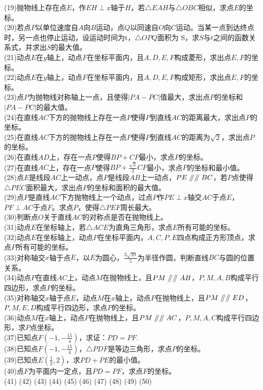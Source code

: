 \documentclass{ecnuthesis}
\newcommand\px{\mathrel{/\mkern-5mu/}}  %
\begin{document}
\begin{example}
    (19)抛物线上存在点$E$，作$EH\perp x$轴于$H$，若$\triangle EAH$与$\triangle OBC$相似，求点$E$的坐标。 \\
    (20)若点$P$以单位速度自$A$向$B$运动，点$Q$以同速自$O$向$C$运动。当某一点到达终点时，另一点也停止运动，设运动时间为t，$\triangle OPQ$面积为
    S，求$S$与$t$之间的函数关系式，并求出$S$的最大值。\\
    (21)动点$E$在$y$轴上，动点$F$在坐标平面内，且$A,D,E,F$构成菱形，求出点$E,F$的坐标。 \\
    (22)动点$E$在$y$轴上，动点$F$在坐标平面内，且$A,D,E,F$构成矩形，求出点$E,F$的坐标。 \\
    (23)点$P$为抛物线对称轴上一点，且使得$|PA-PC|$值最大，求出点$P$的坐标和$|PA-PC|$的最大值。 \\
    (24)在直线$AC$下方的抛物线上存在一点$P$使得$P$到直线$AC$的距离最大，求出点$P$的坐标。 \\
    (25)在直线$AC$下方的抛物线上存在一点$P$使得$P$到直线$AC$的距离为$\sqrt2$，求出点$P$的坐标。 \\
    (26)在直线$AD$上，存在一点$P$使得$BP+CP$最小，求点$P$的坐标。 \\
    (27)在直线$AC$上，存在一点$P$使得$BP+\frac{\sqrt3}{2}CP$最小，求点$P$的坐标和最小值。\\
    (28)点$E$是线段$AC$上一动点，点$P$是线段$AB$上一动点，$PE\px \px BC$，若$P$点使得$\triangle PEC$面积最大，求出点$P$的坐标和面积的最大值。\\
    (29)点$P$是直线$AC$下方抛物线上一个动点，过点$P$作$PE\perp x$轴交$AC$于点$E$，$PF\perp AC$于点$F$。求点$P$，使得$\triangle PEF$周长最大。\\
    (30)判断点$O$关于直线$AC$的对称点是否在抛物线上。\\
    (31)动点$E$在坐标轴上，若$\triangle ACE$为直角三角形，求点$E$所有可能的坐标。 \\
    (32)动点$E$在坐标轴上，动点$P$在坐标平面内，$A,C,P,E$四点构成正方形顶点，求点$P$所有可能的坐标。\\
    (33)对称轴交$x$轴于点$E$，以$E$为圆心，$\frac{3\sqrt{10}}{5}$为半径作圆，判断直线$BC$与圆的位置关系。\\
    (34)动点$P$在直线$AC$上，动点$M$在抛物线上，且$PM\px \px AB$，$P,M,A,B$构成平行四边形，求点$P$的坐标。\\
    (35)对称轴交$x$轴于点$E$，动点$M$在$x$轴上，动点$P$在抛物线上，且$PM\px\px ED$，$P,M,E,D$构成平行四边形，求点$P$的坐标。\\
    (36)动点$M$在$x$轴上，动点$P$在抛物线上，且$PM \px\px AC$，$P,M,A,C$构成平行四边形，求$P$点坐标。\\
    (37)已知点$F(-1,-\frac{15}{4})$，求证：$PD=PF$. \\
    (38)已知点$F(-1,-\frac{15}{4})$，$\triangle PDF$是等边三角形，求点$P$的坐标。\\
    (39)已知点$E(\frac{1}{2},2)$，求$PD+PE$的最小值。\\
    (40)点$F$为平面内一定点，且$PD=PF$，求点$F$的坐标。\\
    (41)
    (42)
    (43)
    (44)
    (45)
    (46)
    (47)
    (48)
    (49)
    (50)
\end{example}
\end{document}
